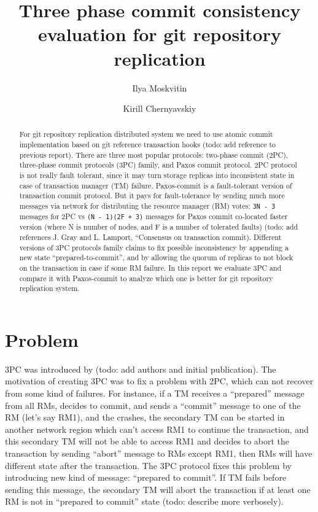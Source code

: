 \documentclass[acmlarge, screen, nonacm]{acmart}
\title{Three phase commit consistency evaluation for git repository replication}
\author{Ilya Moskvitin}
\author{Kirill Chernyavskiy}
\begin{document}
\begin{abstract}
  For git repository replication distributed system we need to use atomic
  commit implementation based on git reference transaction hooks (todo: add reference to previous report).
  There are three most popular protocols: two-phase commit (2PC), three-phase commit protocols (3PC) family,
  and Paxos commit protocol. 2PC protocol is not really fault tolerant, since it may turn storage
  replicas into inconsistent state in case of transaction manager (TM) failure. Paxos-commit is a fault-tolerant
  version of transaction commit protocol. But it pays for fault-tolerance by sending much more messages via network
  for distributing the resource manager (RM) votes: \texttt{3N - 3} messages for 2PC vs
  \texttt{(N - 1)(2F + 3)} messages for Paxos commit co-located faster version (where N is number of nodes,
  and F is a number of tolerated faults)
  (todo: add references  J. Gray and L. Lamport, “Consensus on transaction commit).
  Different versions of 3PC protocols family claims to fix possible inconsistency by appending
  a new state ``prepared-to-commit'', and by allowing the
  quorum of replicas to not block on the transaction in case if some RM failure.
  In this report we evaluate 3PC and compare it with Paxos-commit to analyze which one is better for
  git repository replication system.
\end{abstract}

\maketitle

\section{Problem}

3PC was introduced by (todo: add authors and initial publication). The motivation of creating 3PC was to fix
a problem with 2PC, which can not recover from some kind of failures. For instance, if a TM receives a ``prepared''
message from all RMs, decides to commit, and sends a ``commit'' message to one of the RM (let's say RM1),
and the crashes, the secondary TM can be started in another network region which can't access RM1 to continue the transaction,
and this secondary TM will not be able to access RM1 and decides to abort the transaction by sending ``abort'' message
to RMs except RM1, then RMs will have different state after the transaction.
The 3PC protocol fixes this problem by introducing new kind of message: ``prepared to commit''. If TM fails before sending
this message, the secondary TM will abort the transaction if at least one RM is not in ``prepared to commit'' state
(todo: describe more verbosely).
\end{document}
